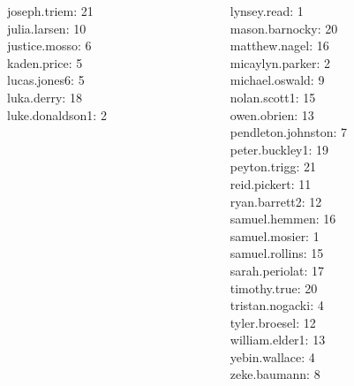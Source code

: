 \documentclass[10pt]{beamer}
\begin{document}
\begin{frame}
\begin{columns}
\begin{column}{0.33\textwidth}
joseph.triem: 21 \\ 
julia.larsen: 10 \\ 
justice.mosso: 6 \\ 
kaden.price: 5 \\ 
lucas.jones6: 5 \\ 
luka.derry: 18 \\ 
luke.donaldson1: 2 \\\end{column}
\begin{column}{0.33\textwidth}
lynsey.read: 1 \\ 
mason.barnocky: 20 \\ 
matthew.nagel: 16 \\ 
micaylyn.parker: 2 \\ 
michael.oswald: 9 \\ 
nolan.scott1: 15 \\ 
owen.obrien: 13 \\ 
pendleton.johnston: 7 \\ 
peter.buckley1: 19 \\ 
peyton.trigg: 21 \\ 
reid.pickert: 11 \\ 
ryan.barrett2: 12 \\ 
samuel.hemmen: 16 \\ 
samuel.mosier: 1 \\ 
samuel.rollins: 15 \\ 
sarah.periolat: 17 \\ 
timothy.true: 20 \\ 
tristan.nogacki: 4 \\ 
tyler.broesel: 12 \\ 
william.elder1: 13 \\ 
yebin.wallace: 4 \\ 
zeke.baumann: 8 \\\end{column}
\end{columns}
\end{frame}
\end{document}
